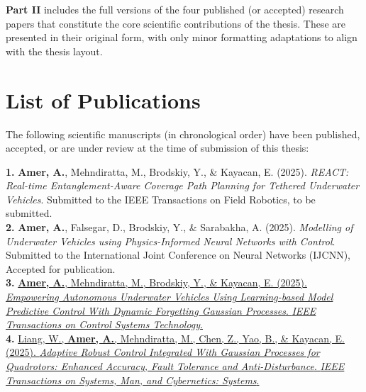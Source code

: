 \textbf{Part II} includes the full versions of the four published (or accepted) research papers that constitute the core scientific contributions of the thesis. These are presented in their original form, with only minor formatting adaptations to align with the thesis layout.







\section*{List of Publications}
The following scientific manuscripts (in chronological order) have been published, accepted, or are under review at the time of submission of this thesis:

\vspace{1em}



\textbf{1.} \textbf{Amer, A.}, Mehndiratta, M., Brodskiy, Y., \& Kayacan, E. (2025). \textit{REACT: Real-time Entanglement-Aware Coverage Path Planning for Tethered Underwater Vehicles}. Submitted to the IEEE Transactions on Field Robotics, to be submitted.\\[0.8em]

\textbf{2.} \textbf{Amer, A.}, Falsegar, D., Brodskiy, Y., \& Sarabakha, A. (2025). \textit{Modelling of Underwater Vehicles using Physics-Informed Neural Networks with Control}. Submitted to the International Joint Conference on Neural Networks (IJCNN), Accepted for publication.\\[0.8em]

\textbf{3.} \href{https://ieeexplore.ieee.org/document/10916556/authors#authors}{\textbf{Amer, A.}, Mehndiratta, M., Brodskiy, Y., \& Kayacan, E. (2025). \textit{Empowering Autonomous Underwater Vehicles Using Learning-based Model Predictive Control With Dynamic Forgetting Gaussian Processes}. \textit{IEEE Transactions on Control Systems Technology}.}\\[0.8em]

\textbf{4.} \href{https://ieeexplore.ieee.org/document/10900576}{Liang, W., \textbf{Amer, A.}, Mehndiratta, M., Chen, Z., Yao, B., \& Kayacan, E. (2025). \textit{Adaptive Robust Control Integrated With Gaussian Processes for Quadrotors: Enhanced Accuracy, Fault Tolerance and Anti-Disturbance}. \textit{IEEE Transactions on Systems, Man, and Cybernetics: Systems}.}\\[0.8em]

